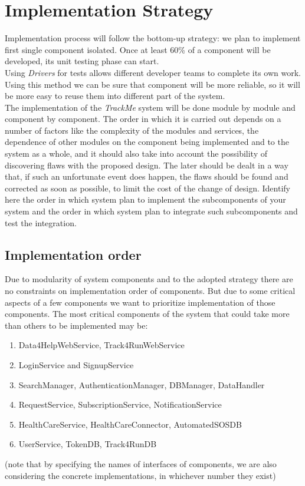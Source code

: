 \documentclass[a4paper, hidelinks, 12pt]{report}
\begin{document}
\section{Implementation Strategy}
Implementation process will follow the bottom-up strategy: we plan to implement first single component isolated. Once at least 60\% of a component will be developed, its unit testing phase can start.\\
Using \textit{Drivers} for tests allows different developer teams to complete its own work. Using this method we can be sure that component will be more reliable, so it will be more easy to reuse them into different part of the system.\\

The implementation of the \textit{TrackMe} system will be done module by module and component by component. The order in which it is carried out depends on a number of factors like the complexity of the modules and services, the dependence of other modules on the component being implemented and to the system as a whole, and it should also take into account the possibility of discovering flaws with the proposed design. The later should be dealt in a way that, if such an unfortunate event does	happen, the flaws should be found and corrected as soon as possible, to limit the cost of the change of design. Identify here the order in which system plan to implement the subcomponents of your system and the order in which system plan to integrate such subcomponents and test the integration.\\

\subsection{Implementation order}
Due to modularity of system components and to the adopted strategy there are no constraints on implementation order of components. But due to some critical aspects of a few components we want to prioritize implementation of those components.
The most critical components of the system that could take more than others to be implemented may be:

\begin{enumerate}
\item{} Data4HelpWebService, Track4RunWebService
\item{} LoginService and SignupService
\item{} SearchManager, AuthenticationManager, DBManager, DataHandler
\item{} RequestService, SubscriptionService, NotificationService
\item{} HealthCareService, HealthCareConnector, AutomatedSOSDB
\item{} UserService, TokenDB, Track4RunDB
\end{enumerate}
(note that by specifying the names of interfaces of components, we are also considering the concrete implementations, in whichever number they exist)\\
\end{document}
